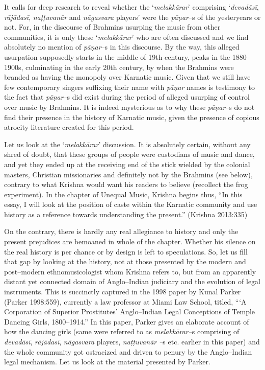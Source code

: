 It calls for deep research to reveal whether the ‘\textit{melakkārar}’ comprising ‘\textit{devadāsī}, \textit{rājādasī}, \textit{naṭṭuvanār} and \textit{nāgasvara} players’ were the \textit{pāṇar}–s of the yesteryears or not. For, in the discourse of Brahmins usurping the music from other communities, it is only these ‘\textit{melakkārar}’ who are often discussed and we find absolutely no mention of \textit{pāṇar}–s in this discourse. By the way, this alleged usurpation supposedly starts in the middle of 19th century, peaks in the 1880–1900s, culminating in the early 20th century, by when the Brahmins were branded as having the monopoly over Karnatic music. Given that we still have few contemporary singers suffixing their name with \textit{pāṇar} names is testimony to the fact that \textit{pāṇar}–s did exist during the period of alleged usurping of control over music by Brahmins. It is indeed mysterious as to why these \textit{pāṇar}–s do not find their presence in the history of Karnatic music, given the presence of copious atrocity literature created for this period.

Let us look at the ‘\textit{melakkārar}’ discussion. It is absolutely certain, without any shred of doubt, that these groups of people were custodians of music and dance, and yet they ended up at the receiving end of the stick wielded by the colonial masters, Christian missionaries and definitely not by the Brahmins (see below), contrary to what Krishna would want his readers to believe (recollect the frog experiment). In the chapter of Unequal Music, Krishna begins thus, “In this essay, I will look at the position of caste within the Karnatic community and use history as a reference towards understanding the present.” (Krishna 2013:335)

On the contrary, there is hardly any real allegiance to history and only the present prejudices are bemoaned in whole of the chapter. Whether his silence on the real history is per chance or by design is left to speculations. So, let us fill that gap by looking at the history, not at those presented by the modern and post–modern ethnomusicologist whom Krishna refers to, but from an apparently distant yet connected domain of Anglo–Indian judiciary and the evolution of legal instruments. This is succinctly captured in the 1998 paper by Kunal Parker (Parker 1998:559), currently a law professor at Miami Law School, titled, “‘A Corporation of Superior Prostitutes’ Anglo–Indian Legal Conceptions of Temple Dancing Girls, 1800–1914.” In this paper, Parker gives an elaborate account of how the dancing girls (same were referred to as \textit{melakkārar–}s comprising of \textit{devadāsī}, \textit{rājādasī}, \textit{nāgasvara} players, \textit{naṭṭuvanār –}s etc. earlier in this paper) and the whole community got ostracized and driven to penury by the Anglo–Indian legal mechanism. Let us look at the material presented by Parker.

